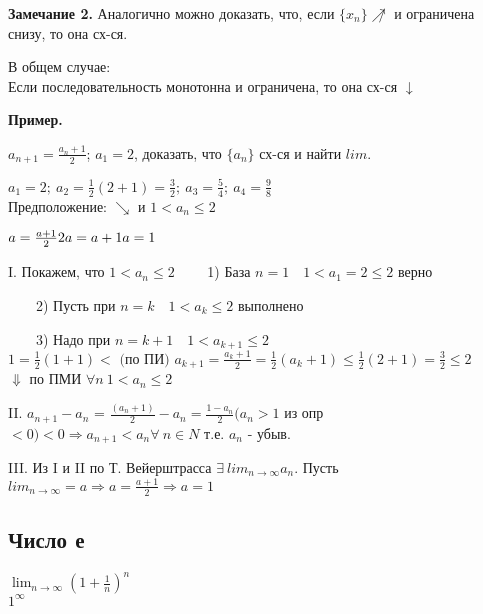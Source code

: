 \documentclass{article}
\begin{document}
    \textbf{Замечание 2.}
    Аналогично можно доказать, что, если \(\{x_n\} \not\nearrow\) и ограничена снизу, то она сх-ся.
    
    В общем случае:
    \\ Если последовательность монотонна и ограничена, то она сх-ся \(\downarrow\)
    
    \textbf{Пример.}

    \(a_{n+1} = \frac{a_n + 1}{2}\); \(a_1 = 2\), доказать, что \(\{a_n\}\) сх-ся и найти \(lim\).

    \(a_1 = 2;\ a_2 = \frac{1}{2}(2+1) = \frac{3}{2};\ a_3 = \frac{5}{4};\ a_4 = \frac{9}{8}\)
    \\ Предположение: \(\searrow\) и \(1 < a_n \leq 2\)

    \(a = \frac{a+1}{2} \\ 2a = a + 1 \\ a = 1\)

    I. Покажем, что \(1 < a_n \leq 2\)
    \ \ \ \ 1) База \(n = 1 \quad 1 < a_1 = 2 \leq 2\) верно

    \ \ \ \ 2) Пусть при \(n = k \quad 1 < a_k \leq 2\) выполнено

    \ \ \ \ 3) Надо при \(n = k + 1 \quad 1 < a_{k+1} \leq 2\)
    \\ \(1 = \frac{1}{2}(1+1) < \textrm{ (по ПИ) } a_{k+1} = \frac{a_k + 1}{2} = \frac{1}{2}(a_k + 1) \leq \frac{1}{2}(2 + 1) = \frac{3}{2} \leq 2\)
    \\ \(\Downarrow\) по ПМИ \(\forall n \ 1 < a_n \leq 2\)

    II. \( a_{n+1} - a_n \) = \( \frac{(a_n+1)}{2} - a_n = \frac{1-a_n}{2} (a_n > 1\) из опр \(<0) < 0 \Rightarrow a_{n+1} < a_n \forall\ n \in N \) т.е. \( a_n \) - убыв.

    III. Из I и II по Т. Вейерштрасса \( \exists\ lim_{n \rightarrow \infty}a_n \). Пусть \(lim_{n \rightarrow \infty } = a \Rightarrow a = \frac{a + 1}{2} \Rightarrow a = 1 \)

    \subsection{Число е}

    \(\lim_{n \rightarrow \infty}{(1 + \frac{1}{n})^n}\)
    \\ \(1^{\infty}\)
\end{document}
